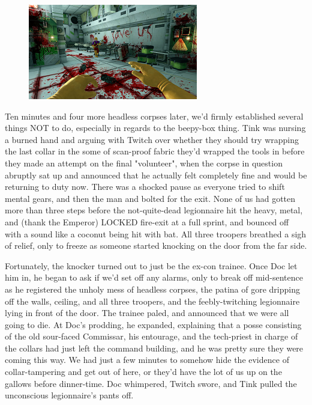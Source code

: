 \begin{figure}
	\begin{center}
		\includegraphics[width=\figwidth]{pics/21/26.png}
	\end{center}
\end{figure}
Ten minutes and four more headless corpses later, we'd firmly established several things NOT to do, especially in regards to the beepy-box thing. 
Tink was nursing a burned hand and arguing with Twitch over whether they should try wrapping the last collar in the some of scan-proof fabric they'd wrapped the tools in before they made an attempt on the final "volunteer", when the corpse in question abruptly sat up and announced that he actually felt completely fine and would be returning to duty now. 
There was a shocked pause as everyone tried to shift mental gears, and then the man and bolted for the exit. 
None of us had gotten more than three steps before the not-quite-dead legionnaire hit the heavy, metal, and (thank the Emperor) LOCKED fire-exit at a full sprint, and bounced off with a sound like a coconut being hit with bat. 
All three troopers breathed a sigh of relief, only to freeze as someone started knocking on the door from the far side.

Fortunately, the knocker turned out to just be the ex-con trainee. 
Once Doc let him in, he began to ask if we'd set off any alarms, only to break off mid-sentence as he registered the unholy mess of headless corpses, the patina of gore dripping off the walls, ceiling, and all three troopers, and the feebly-twitching legionnaire lying in front of the door. 
The trainee paled, and announced that we were all going to die. 
At Doc's prodding, he expanded, explaining that a posse consisting of the old sour-faced Commissar, his entourage, and the tech-priest in charge of the collars had just left the command building, and he was pretty sure they were coming this way. 
We had just a few minutes to somehow hide the evidence of collar-tampering and get out of here, or they'd have the lot of us up on the gallows before dinner-time. 
Doc whimpered, Twitch swore, and Tink pulled the unconscious legionnaire's pants off.

